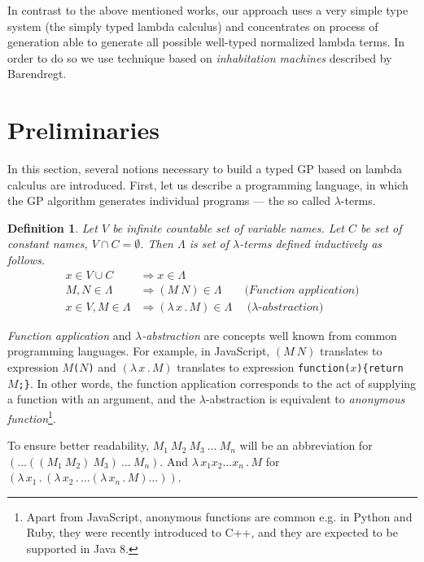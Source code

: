 \documentclass{sig-alternate}
\newtheorem{definition}{Definition}
\newcommand{\lets}{let us\xspace}
\newcommand{\lterms}{$\lambda$-terms\xspace}
\newcommand{\then}{\Rightarrow\xspace}
\newcommand{\lamb}[2]{( \lambda \, #1 \, . \, #2 )}
\newcommand{\lam}[2]{\lambda \, #1 \, . \, #2}
\newcommand{\red}[1]{{\color{red} #1}}
\begin{document}
In contrast to the above mentioned works, our approach uses a very simple type system (the simply typed lambda calculus) and concentrates on process of generation  
able to generate all possible well-typed normalized lambda terms. In order to do so we use technique based on \textit{inhabitation machines} described by Barendregt\cite{barendregt10}.    

\section{Preliminaries}
\label{preliminaries}


In this section, several notions necessary to build a typed GP based on lambda calculus are introduced. 
First, \lets describe a programming language, 
in which the GP algorithm generates individual programs --- the so called \lterms.

\begin{definition}
Let $V$ be infinite countable set of {\it 
variable names}. Let $C$ be set of {\it constant names}, 
$V \cap C = \emptyset$.	 	
Then $\Lambda$ is set of {\it \lterms} defined inductively as follows.	
\begin{align*}
x   \in V \cup C  &\then x     \in \Lambda \\
M,N \in \Lambda   &\then (M~N) \in \Lambda 
\textit{~~~~~~(Function application)} \\
x   \in V , M \in \Lambda &\then \lamb{x}{M} \in \Lambda
\textit{~~~~($\lambda$-abstraction)} 
\end{align*}
\end{definition}


\textit{Function application} and 
\textit{$\lambda$-abstraction} are concepts
well known from common programming languages. 
For example, in JavaScript, 
$(M~N)$ translates to expression \texttt{$M$($N$)} and
$\lamb{x}{M}$ translates to expression \texttt{function($x$)\{return $M$;\}}.
In other words, the function application 
corresponds to the act of supplying a function 
with an argument, and
the $\lambda$-abstraction is equivalent to 
\textit{anonymous function}\footnote{Apart from JavaScript, anonymous functions are common e.g. in Python and Ruby, 
they were recently introduced to C++, and they are expected to be supported in Java 8.}.

To ensure better readability, 
$M_1~M_2~M_3~\dots~M_n$ will be an abbreviation for 
$(\dots((M_1~M_2)~M_3)~\dots~M_n)$.
And $\lam{x_1 x_2 \dots x_n }{M}$  for
$\lamb{x_1}{\lamb{x_2}{\dots\lamb{x_n}{M}\dots}}$.
\end{document}
